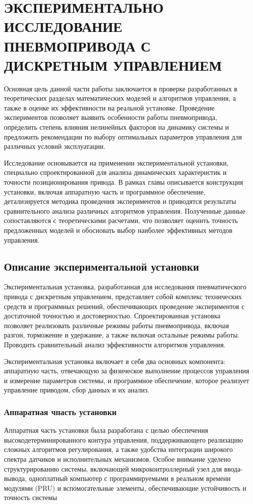 \chapter{ЭКСПЕРИМЕНТАЛЬНО ИССЛЕДОВАНИЕ ПНЕВМОПРИВОДА С ДИСКРЕТНЫМ УПРАВЛЕНИЕМ}\label{ch:ch5}
Основная цель данной части работы заключается в проверке разработанных в
теоретических разделах математических моделей и алгоритмов управления,
а также в оценке их эффективности на реальной установке. Проведение экспериментов позволяет
выявить особенности работы пневмопривода, определить степень влияния
нелинейных факторов на динамику системы и предложить рекомендации по
выбору оптимальных параметров управления для различных условий эксплуатации.

Исследование основывается на применении экспериментальной установки,
специально спроектированной для анализа динамических характеристик и
точности позиционирования привода. В рамках главы описывается конструкция
установки, включая аппаратную часть и программное обеспечение, детализируется
методика проведения экспериментов и приводятся результаты сравнительного
анализа различных алгоритмов управления. Полученные данные сопоставляются с
теоретическими расчетами, что позволяет оценить точность предложенных моделей
и обосновать выбор наиболее эффективных методов управления.

\section{Описание экспериментальной установки}\label{sec:ch5/sec1}
Экспериментальная установка, разработанная для исследования пневматического привода с
дискретным управлением, представляет собой комплекс технических средств и
программных решений, обеспечивающих проведение экспериментов с достаточной точностью и достоверностью.
Спроектированная установка позволяет реализовать различные режимы работы
пневмопривода, включая разгон, торможение и удержание, а также включая остальные режимы работы.
Проводить сравнительный анализ эффективности алгоритмов управления.

Экспериментальная установка включает в себя два основных компонента:
аппаратную часть, отвечающую за физическое выполнение процессов управления и
измерение параметров системы, и программное обеспечение, которое реализует
управление приводом, сбор данных и их анализ.

\subsection{Аппаратная чпасть установки}\label{sec:ch5/sec1/subsec1}
Аппаратная часть установки была разработана с целью обеспечения высокодетерминированного контура управления,
поддерживающего реализацию сложных алгоритмов регулирования, а также удобства интеграции широкого
спектра датчиков и исполнительных механизмов. Особое внимание уделено структурированию системы,
включающей микроконтроллерный узел для ввода-вывода, одноплатный компьютер с программируемыми в
реальном времени модулями (PRU) и вспомогательные элементы, обеспечивающие устойчивость и точность системы


